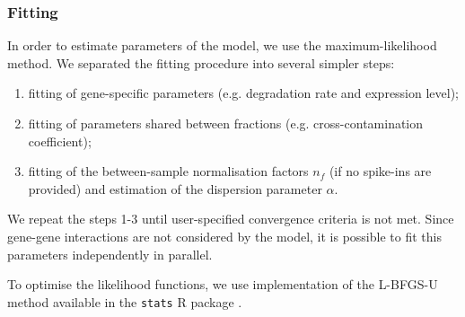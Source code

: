 \subsubsection{Fitting}
In order to estimate parameters of the model, we use the maximum-likelihood method.
We separated the fitting procedure into several simpler steps:
\begin{enumerate}
 \item fitting of gene-specific parameters (e.g. degradation rate and expression level);
 \item fitting of parameters shared between fractions (e.g. cross-contamination coefficient); 
 \item fitting of the between-sample normalisation factors $n_f$
 (if no spike-ins are provided) and estimation of the dispersion parameter $\alpha$.
\end{enumerate}
We repeat the steps 1-3 until
user-specified convergence criteria is not met.
 Since gene-gene interactions are not considered by the model, it is possible to 
 fit this parameters independently in parallel. 

To optimise the likelihood functions, 
we use implementation of the {L-BFGS-U} method \citep{byrd1995limited} 
available in the \verb|stats| R package \citep{rlang}.

